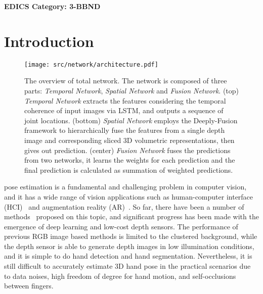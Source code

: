 \documentclass[journal,comsoc]{IEEEtran}
\let\MYoriglatexcaption\caption
\renewcommand{\caption}[2][\relax]{\MYoriglatexcaption[#2]{#2}}
\begin{document}
\ifCLASSOPTIONpeerreview
\begin{center} \bfseries EDICS Category: 3-BBND \end{center}
\fi
%
\IEEEpeerreviewmaketitle


\section{Introduction}\label{sec:introduction}
\begin{figure*}[htbp]
    \centering
    \texttt{[image: src/network/architecture.pdf]}
    \caption{The overview of total network. The network is composed of three parts: \emph{Temporal Network},
    \emph{Spatial Network} and \emph{Fusion Network}.
    (top) \emph{Temporal Network} extracts the features considering the temporal coherence of input images via LSTM,
    and outputs a sequence of joint locations.
    (bottom) \emph{Spatial Network} employs the Deeply-Fusion
    framework to hierarchically fuse the features from a single depth image and corresponding sliced 3D volumetric representations,
    then gives out prediction.
    (center) \emph{Fusion Network} fuses the predictions from two networks, it learns the weights for each prediction
    and the final prediction is calculated as summation of weighted predictions.}
\label{fig:architecture}
\end{figure*}
 pose estimation is a fundamental and challenging problem in computer vision,
and it has a wide range of vision applications such as human-computer interface
(HCI)~\cite{sato2001real,erol2007vision} and augmentation reality (AR)~\cite{barsoum2016articulated}. So far, there
have been a number of methods~\cite{Ge_2016_CVPR,deng2017hand3d,Ge_2017_CVPR,
sinha2016deephand,sun2015cascaded, wan2016direction,ye2016spatial,li20153d,zhang2016learning,
wang2009real,romero2009monocular,Zimmermann_2017_ICCV,panteleris2017back,oberweger2017deepprior++}
proposed on this topic, and significant progress has been made with the emergence of deep
learning and low-cost depth sensors. The performance of previous RGB image based methods
is limited to the clustered background, while the depth sensor is able to generate depth images in low
illumination conditions, and it is simple to do hand detection and hand segmentation.
Nevertheless, it is still difficult to accurately estimate 3D hand pose in the practical scenarios due
to data noises, high freedom of degree for hand motion, and self-occlusions between fingers.
\end{document}
